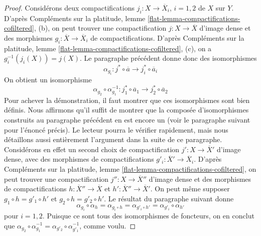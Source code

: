 \begin{proof}
\medskip\noindent
Considérons deux compactifications $j_i : X \to \overline{X}_i$, $i = 1, 2$ de $X$ sur $Y$. D'après Compléments sur la platitude, lemme \ref{flat-lemma-compactifications-cofiltered}, (b), on peut trouver une compactification $j : X \to \overline{X}$ d'image dense et des morphismes $g_i : \overline{X} \to \overline{X}_i$ de compactifications. D'après Compléments sur la platitude, lemme \ref{flat-lemma-compactifications-cofiltered}, (c), on a $g_i^{-1}(j_i(X)) = j(X)$. Le paragraphe précédent donne donc des isomorphismes
$$
\alpha_{g_i} :
j^* \circ \overline{a}
\longrightarrow
j_i^* \circ \overline{a}_i
$$
On obtient un isomorphisme
$$
\alpha_{g_2} \circ \alpha_{g_1}^{-1} :
j_1^* \circ \overline{a}_1 \to j_2^* \circ \overline{a}_2
$$
Pour achever la démonstration, il faut montrer que ces isomorphismes sont bien définis. Nous affirmons qu'il suffit de montrer que la composée d'isomorphismes construits au paragraphe précédent en est encore un (voir le paragraphe suivant pour l'énoncé précis). Le lecteur pourra le vérifier rapidement, mais nous détaillons aussi entièrement l'argument dans la suite de ce paragraphe. Considérons en effet un second choix de compactification $j' : X \to \overline{X}'$ d'image dense, avec des morphismes de compactifications $g'_i : \overline{X}' \to \overline{X}_i$. D'après Compléments sur la platitude, lemme \ref{flat-lemma-compactifications-cofiltered}, on peut trouver une compactification $j'' : X \to \overline{X}''$ d'image dense et des morphismes de compactifications $h : \overline{X}'' \to \overline{X}$ et $h' : \overline{X}'' \to \overline{X}'$. On peut même supposer $g_1 \circ h = g'_1 \circ h'$ et $g_2 \circ h = g'_2 \circ h'$. Le résultat du paragraphe suivant donne
$$
\alpha_{g_i} \circ \alpha_h = \alpha_{g_i \circ h} =
\alpha_{g'_i \circ h'} = \alpha_{g'_i} \circ \alpha_{h'}
$$
pour $i = 1, 2$. Puisque ce sont tous des isomorphismes de foncteurs, on en conclut que $\alpha_{g_2} \circ \alpha_{g_1}^{-1} =
\alpha_{g'_2} \circ \alpha_{g'_1}^{-1}$, comme voulu.


\end{proof}
